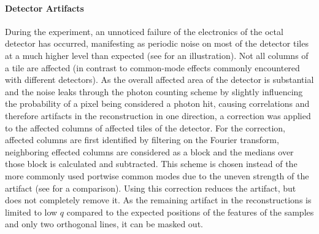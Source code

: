 \paragraph{Detector Artifacts}
During the experiment, an unnoticed failure of the electronics of the octal detector has occurred, manifesting as periodic noise on most of the detector tiles at a much higher level than expected (see  for an illustration). Not all columns of a tile are affected (in contrast to common-mode effects commonly encountered with different detectors). As the overall affected area of the detector is substantial and the noise leaks through the photon counting scheme by slightly influencing the probability of a pixel being considered a photon hit, causing correlations and therefore artifacts in the reconstruction in one direction, a correction was applied to the affected columns of affected tiles of the detector. For the correction, affected columns are first identified by filtering on the Fourier transform, neighboring effected columns are considered as a block and the medians over those block is calculated and subtracted. This scheme is chosen instead of the more commonly used portwise common modes due to the uneven strength of the artifact (see  for a comparison). Using this correction reduces the artifact, but does not completely remove it. As the remaining artifact in the reconstructions is limited to low $q$ compared to the expected positions of the features of the samples and only two orthogonal lines, it can be masked out.




